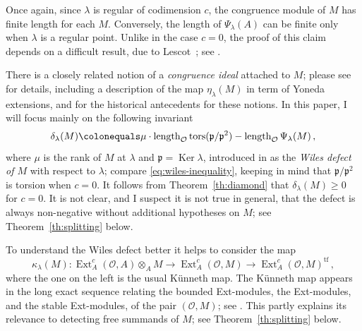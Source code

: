 \documentclass[twoside,leqno]{article}
\newcommand{\cmod}{\Psi}
\newcommand{\ext}{\operatorname{Ext}}
\newcommand{\fp}{{\mathfrak p}}
\newcommand{\Ker}{\operatorname{Ker}}
\newcommand{\length}{\operatorname{length}}
\newcommand{\mco}{\mathcal O}
\newcommand{\tors}{\operatorname{tors}}
\newcommand{\tfree}[1]{{#1}^{\operatorname{tf}}}
\begin{document}
 Once again, since $\lambda$ is regular of codimension $c$, the congruence module of $M$ has finite length for each $M$. Conversely, the length of $\cmod_\lambda(A)$ can be finite only when $\lambda$ is  a regular  point. Unlike in the case $c=0$, the proof of this claim depends on a difficult result, due to Lescot~\cite{Lescot:1983}; see \cite[Theorem~2.1 and Notes 2.1.1]{Iyengar/Khare/Manning:2025a}.
 
 There is a closely related notion of a \emph{congruence ideal} attached to $M$; please see \cite{Iyengar/Khare/Manning:2025a} for details, including a description of the map $\eta_\lambda(M)$ in term of Yoneda extensions, and for the historical antecedents for these notions.  In this paper, I will focus mainly on the following invariant 
\begin{equation}
\label{eq:defect}
\delta_{\lambda}(M)\colonequals 
    \mu\cdot \length_{\mco} \tors(\fp/\fp^2)  - \length_{\mco}\cmod_\lambda(M)\,,
\end{equation}
where $\mu$ is the rank of $M$ at $\lambda$ and  $\fp=\Ker\lambda$, introduced in \cite{Iyengar/Khare/Manning:2024a} as the \emph{Wiles defect of $M$} with respect to $\lambda$; compare \eqref{eq:wiles-inequality}, keeping in mind that $\fp/\fp^2$ is torsion when $c=0$. It follows from Theorem~\ref{th:diamond} that $\delta_{\lambda}(M)\ge 0$ for $c=0$. It is not clear, and I suspect it is not true in general, that the defect is always non-negative without additional hypotheses on $M$; see Theorem~\ref{th:splitting} below.

To understand the Wiles defect better it helps to consider the map
\begin{equation}
    \label{eq:kappaM}
    \kappa_\lambda(M)\colon \ext^c_A(\mco,A)\otimes_A M \longrightarrow \ext_A^c(\mco,M) \longrightarrow \tfree{\ext_A^c(\mco,M)}\,,
\end{equation}
where the one on the left is the usual K\"unneth map. The K\"unneth map appears in the long exact sequence relating the bounded Ext-modules, the Ext-modules, and the stable Ext-modules, of the pair $(\mco,M)$; see \cite[Notes 2.4.1]{Iyengar/Khare/Manning:2025a}. This partly explains its relevance to detecting free summands of $M$; see Theorem~\ref{th:splitting} below.
\end{document}
